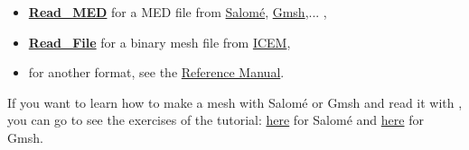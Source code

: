\begin{itemize}
\item \href{../../Outils/TRIOXDATA/XTriou/doc.pdf\#readmed}{\textbf{Read\_MED}} for a MED file from \href{http://www.salome-platform.org}{Salom\'e}, \href{http://gmsh.info/}{Gmsh},... ,
\item \href{../../Outils/TRIOXDATA/XTriou/doc.pdf\#readfile}{\textbf{Read\_File}} for a binary mesh file from \href{http://resource.ansys.com/Products/Other+Products/ANSYS+ICEM+CFD}{ICEM},
\item for another format, see the \href{../../Outils/TRIOXDATA/XTriou/doc.pdf\#read}{\trust Reference Manual}.
\end{itemize}

If you want to learn how to make a mesh with Salom\'e or Gmsh and read it with \trust, you can go to see the exercises of the \trust tutorial: \href{TRUST_tutorial.pdf\#salome}{here} for Salom\'e and \href{TRUST_tutorial.pdf\#gmsh}{here} for Gmsh.





